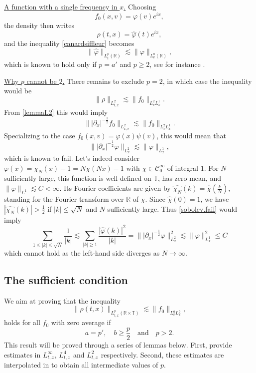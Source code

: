 \documentclass[11pt,a4paper,reqno]{amsart}
\theoremstyle{plain}
\theoremstyle{remark}
\begin{document}
\medskip

\noindent
\underline{A function with a single frequency in $x$.} Choosing
\[
    f_0(x,v) = \varphi(v) e^{ix},
\]
the density then writes
\[
    \rho(t,x) = \widehat{\varphi}(t) e^{ix},
\]
and the inequality \eqref{canardsiffleur} becomes
\[
    \| \widehat{\varphi} \|_{L^p_t(\mathbb{R})} \lesssim \| \varphi \|_{L^a_v(\mathbb{R})},
\]
which is known to hold only if $p = a'$ and $p \geq 2$, see for instance \cite{Tao}. 

\medskip
\noindent
\underline{Why $p$ cannot be $2$.} There remains to exclude $p=2$, in which case the inequality would be
\[
    \|\rho \|_{L^2_{t,x}} \lesssim \| f_0 \|_{L^2_v L^1_x}.
\]
From \cref{lemmaL2} this would imply
\[
    \||\partial_x|^{-\frac 1 2} f_0 \|_{L^2_{x,v}} \lesssim \| f_0 \|_{L^2_v L^1_x}.
\]
Specializing to the case $f_0(x,v) = \varphi(x) \psi(v)$, this would mean that
\begin{equation}\label{sobolev.fail}
    \| |\partial_x|^{-\frac 1 2} \varphi \|_{L^2_{x}} \lesssim \| \varphi \|_{L^1_x},
\end{equation}
which is known to fail. Let's indeed consider $\varphi(x)=\chi_N(x)-1=N\chi(Nx)-1$ with $\chi \in \mathcal{C}_0^\infty$ of integral $1$. For $N$ sufficiently large, this function is well-defined on $\mathbb{T}$, has zero mean, and $\|\varphi\|_{L^{1}} \lesssim C < \infty$. Its Fourier coefficients are given by $\widehat{\chi_N}(k)=\widehat{\chi}\left(\frac{k}{N}\right)$, standing for the Fourier transform over $\mathbb{R}$ of $\chi$. Since $\widehat{\chi}(0) =1$, we have $|\widehat{\chi_N}(k)| > \frac{1}{2}$ if $|k| \leq \sqrt N$ and $N$ sufficiently large. Thus \eqref{sobolev.fail} would imply
\[
   \sum_{1 \leq |k|\leq \sqrt{N}} \frac{1}{|k|} \lesssim \sum_{|k|\geq 1} \frac{|\hat{\varphi}(k)|^2}{|k|} = \| |\partial_x|^{-\frac 1 2} \varphi \|_{L^2_{x}}^2 \lesssim \|\varphi\|_{L^1_x}^2 \leq C 
\]
which cannot hold as the left-hand side diverges as $N\to \infty$.

\subsection{The sufficient condition}
We aim at proving that the inequality
\begin{equation}
\label{canardsiffleur-bis}
    \| \rho(t,x) \|_{L^{p}_{t,x}(\mathbb{R} \times \mathbb{T})} \lesssim \| f_0 \|_{L^{a}_v L^{b}_x},
\end{equation}
holds for all $f_0$ with zero average if
\[
    a = p', \quad b \geq \frac{p}{2} \quad \text{and} \quad p>2.
\]
This result will be proved through a series of lemmas below. First,  provide estimates in $L^\infty_{t,x}$, $L^4_{t,x}$ and $L^2_{t,x}$ respectively. Second, these estimates are interpolated in  to obtain all intermediate values of $p$.
\end{document}
